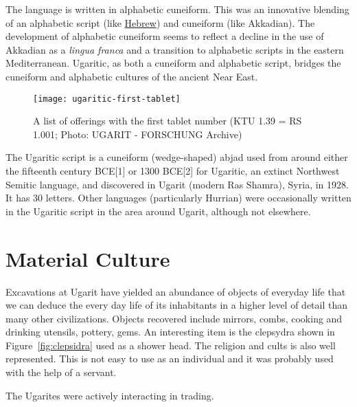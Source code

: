 The  language  is written in alphabetic cuneiform. This was an innovative blending of an alphabetic script (like \hyperref[s:hebrew]{Hebrew}) and cuneiform (like Akkadian). The development of alphabetic cuneiform seems to reflect a decline in the use of Akkadian as a \textit{lingua franca} and a transition to alphabetic scripts in the eastern Mediterranean. Ugaritic, as both a cuneiform and alphabetic script, bridges the cuneiform and alphabetic cultures of the ancient Near East.


\begin{figure}[hb]
\centering
\texttt{[image: ugaritic-first-tablet]}
\caption{A list of offerings with the first tablet number (KTU 1.39 = RS 1.001; Photo: UGARIT - FORSCHUNG Archive)}
\end{figure}

The Ugaritic script is a cuneiform (wedge-shaped) abjad used from around either the fifteenth century BCE[1] or 1300 BCE[2] for Ugaritic, an extinct Northwest Semitic language, and discovered in Ugarit (modern Ras Shamra), Syria, in 1928. It has 30 letters. Other languages (particularly Hurrian) were occasionally written in the Ugaritic script in the area around Ugarit, although not elsewhere.


\section{Material Culture}

Excavations at Ugarit have yielded an abundance of objects of everyday life that we can deduce the every day life of its inhabitants in a higher level of detail than many other civilizations. Objects recovered include mirrors, combs, cooking and drinking utensils, pottery, gems. An interesting item is the clepsydra shown in Figure~\ref{fig:clepsidra} used as a shower head. The religion and cults is also well represented. This is not easy to use as an individual and it was probably used with the help of a servant.

The Ugarites were actively interacting in trading. 

